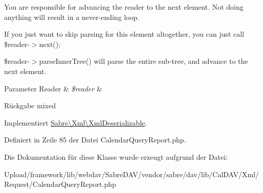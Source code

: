 You are responsible for advancing the reader to the next element. Not doing anything will result in a never-\/ending loop.

If you just want to skip parsing for this element altogether, you can just call \$reader-\/$>$next();

\$reader-\/$>$parse\+Inner\+Tree() will parse the entire sub-\/tree, and advance to the next element.


\begin{DoxyParams}[1]{Parameter}
Reader & {\em \$reader} & \\
\hline
\end{DoxyParams}
\begin{DoxyReturn}{Rückgabe}
mixed 
\end{DoxyReturn}


Implementiert \mbox{\hyperlink{interface_sabre_1_1_xml_1_1_xml_deserializable_a19e0eca545b9a0d93f7d6b69085ade30}{Sabre\textbackslash{}\+Xml\textbackslash{}\+Xml\+Deserializable}}.



Definiert in Zeile 85 der Datei Calendar\+Query\+Report.\+php.



Die Dokumentation für diese Klasse wurde erzeugt aufgrund der Datei\+:\begin{DoxyCompactItemize}
\item 
Upload/framework/lib/webdav/\+Sabre\+D\+A\+V/vendor/sabre/dav/lib/\+Cal\+D\+A\+V/\+Xml/\+Request/Calendar\+Query\+Report.\+php\end{DoxyCompactItemize}
